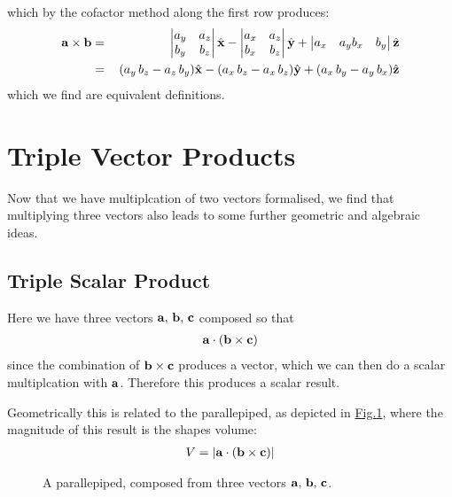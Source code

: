 \documentclass[letterpaper,10pt,english]{jupyterBook}
\begin{document}
\sphinxAtStartPar
which by the cofactor method along the first row produces:
\begin{equation*}
\begin{split} \mathbf{a}\times\mathbf{b} &=&\, \begin{vmatrix}
 a_y & a_z \\
 b_y & b_z
\end{vmatrix}\hat{\bf x} - \begin{vmatrix}
 a_x & a_z \\
 b_x & b_z
\end{vmatrix}\hat{\bf y} + \begin{vmatrix}
 a_x & a_y 
 b_x & b_y 
\end{vmatrix}\hat{\bf z} \\
&=&\, (a_y\,b_z - a_z\,b_y)\hat{\bf x} - (a_x\,b_z - a_x\,b_z)\hat{\bf y} + (a_x\,b_y - a_y\,b_x)\hat{\bf z} \end{split}
\end{equation*}
\sphinxAtStartPar
which we find are equivalent definitions.


\section{Triple Vector Products}
\label{\detokenize{VectorCalculus/vectoralgebra:triple-vector-products}}
\sphinxAtStartPar
Now that we have multiplcation of two vectors formalised, we find that multiplying three vectors also leads to some further geometric and algebraic ideas.


\subsection{Triple Scalar Product}
\label{\detokenize{VectorCalculus/vectoralgebra:triple-scalar-product}}
\sphinxAtStartPar
Here we have three vectors \(\bf a, \,b,\,c\) composed so that
\begin{equation*}
\begin{split}\bf a \cdot (b \times c)\end{split}
\end{equation*}
\sphinxAtStartPar
since the combination of \(\bf b \times c\) produces a vector, which we can then do a scalar multiplcation with \(\bf a\).  Therefore this produces a scalar result.

\sphinxAtStartPar
Geometrically this is related to the parallepiped, as depicted in \hyperref[\detokenize{VectorCalculus/vectoralgebra:parallepiped}]{Fig.\@ \ref{\detokenize{VectorCalculus/vectoralgebra:parallepiped}}}, where the magnitude of this result is the shapes volume:
\begin{equation*}
\begin{split}V = |{\bf a \cdot (b \times c)}|\end{split}
\end{equation*}
\begin{figure}[htbp]
\centering
\capstart

\noindent{}
\caption{A parallepiped, composed from three vectors \(\bf a, \,b,\,c\).}\label{\detokenize{VectorCalculus/vectoralgebra:parallepiped}}\end{figure}
\end{document}
